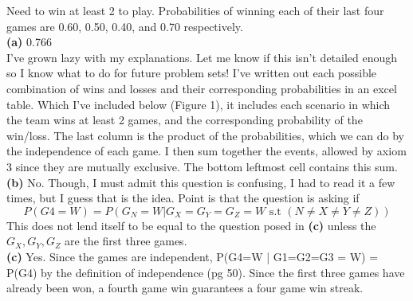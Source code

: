 \documentclass[12pt]{article}
\newenvironment{problem}[2][Problem]{\begin{trivlist}
\item[\hskip \labelsep {\bfseries #1}\hskip \labelsep {\bfseries #2.}]}{\end{trivlist}}
\begin{document}
\begin{problem}{2.4.23} Need to win at least 2 to play. Probabilities of winning each of their last four games are 0.60, 0.50, 0.40, and 0.70 respectively.\\
\textbf{(a)} 0.766 \\
I've grown lazy with my explanations. Let me know if this isn't detailed enough so I know what to do for future problem sets! I've written out each possible combination of wins and losses and their corresponding probabilities in an excel table. Which I've included below (Figure 1), it includes each scenario in which the team wins at least 2 games, and the corresponding probability of the win/loss. The last column is the product of the probabilities, which we can do by the independence of each game. I then sum together the events, allowed by axiom 3 since they are mutually exclusive. The bottom leftmost cell contains this sum.\\
\textbf{(b)} No. Though, I must admit this question is confusing, I had to read it a few times, but I guess that is the idea. Point is that the question is asking if $$P(G4=W) = P(G_N=W | G_X=G_Y=G_Z=W \text{ s.t }(N \neq X \neq Y \neq Z))$$ This does not lend itself to be equal to the question posed in \textbf{(c)} unless the $G_X,G_Y,G_Z$ are the first three games. \\
\textbf{(c)} Yes. Since the games are independent, P(G4=W | G1=G2=G3 = W) = P(G4) by the definition of independence (pg 50). Since the first three games have already been won, a fourth game win guarantees a four game win streak.  

\end{problem}
\end{document}
